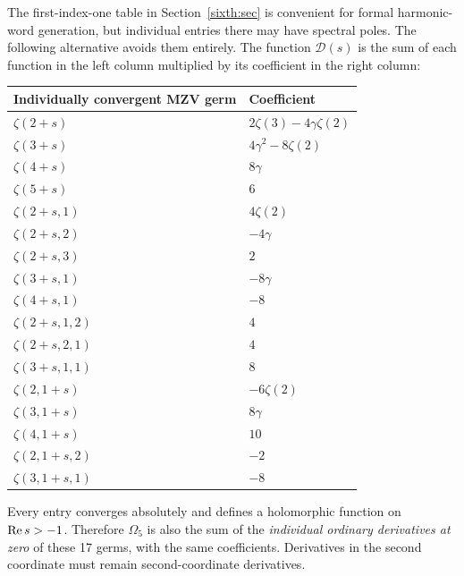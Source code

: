 The first-index-one table in Section~\ref{sixth:sec} is convenient for
formal harmonic-word generation, but individual entries there may
have spectral poles.  The following alternative avoids them entirely.
The function $\mathcal D(s)$ is the sum of each function in the left
column multiplied by its coefficient in the right column:
\begin{center}
\begin{tabular}{@{}ll@{}}
\toprule
Individually convergent MZV germ & Coefficient \\
\midrule
$\zeta(2+s)$ & $2\zeta(3)-4\gamma\zeta(2)$\\
$\zeta(3+s)$ & $4\gamma^2-8\zeta(2)$\\
$\zeta(4+s)$ & $8\gamma$\\
$\zeta(5+s)$ & $6$\\
$\zeta(2+s,1)$ & $4\zeta(2)$\\
$\zeta(2+s,2)$ & $-4\gamma$\\
$\zeta(2+s,3)$ & $2$\\
$\zeta(3+s,1)$ & $-8\gamma$\\
$\zeta(4+s,1)$ & $-8$\\
$\zeta(2+s,1,2)$ & $4$\\
$\zeta(2+s,2,1)$ & $4$\\
$\zeta(3+s,1,1)$ & $8$\\
$\zeta(2,1+s)$ & $-6\zeta(2)$\\
$\zeta(3,1+s)$ & $8\gamma$\\
$\zeta(4,1+s)$ & $10$\\
$\zeta(2,1+s,2)$ & $-2$\\
$\zeta(3,1+s,1)$ & $-8$\\
\bottomrule
\end{tabular}
\end{center}
Every entry converges absolutely and defines a holomorphic function
on $\operatorname{Re} s>-1$.  Therefore $\Omega_5$ is also the sum of the
\emph{individual ordinary derivatives at zero} of these 17 germs,
with the same coefficients.  Derivatives in the second coordinate
must remain second-coordinate derivatives.

